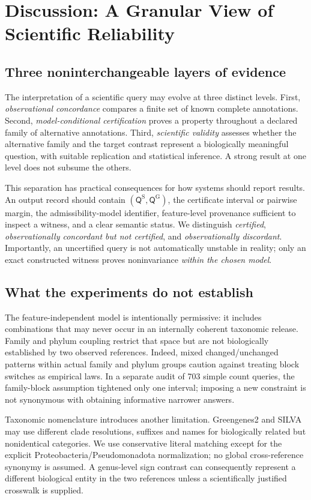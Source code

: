 \documentclass[conference]{IEEEtran}
\newcommand{\Q}{\mathsf{Q}}
\newcommand{\Sref}{\mathrm{S}}
\newcommand{\Gref}{\mathrm{G}}
\begin{document}
\section{Discussion: A Granular View of Scientific Reliability}
\label{sec:discussion}
\subsection{Three noninterchangeable layers of evidence}
The interpretation of a scientific query may evolve at three distinct levels. First, \emph{observational concordance} compares a finite set of known complete annotations. Second, \emph{model-conditional certification} proves a property throughout a declared family of alternative annotations. Third, \emph{scientific validity} assesses whether the alternative family and the target contrast represent a biologically meaningful question, with suitable replication and statistical inference. A strong result at one level does not subsume the others.

This separation has practical consequences for how systems should report results. An output record should contain $(\Q^{\Sref},\Q^{\Gref})$, the certificate interval or pairwise margin, the admissibility-model identifier, feature-level provenance sufficient to inspect a witness, and a clear semantic status. We distinguish \emph{certified}, \emph{observationally concordant but not certified}, and \emph{observationally discordant}. Importantly, an uncertified query is not automatically unstable in reality; only an exact constructed witness proves noninvariance \emph{within the chosen model}.

\subsection{What the experiments do not establish}
The feature-independent model is intentionally permissive: it includes combinations that may never occur in an internally coherent taxonomic release. Family and phylum coupling restrict that space but are not biologically established by two observed references. Indeed, mixed changed/unchanged patterns within actual family and phylum groups caution against treating block switches as empirical laws. In a separate audit of 703 simple count queries, the family-block assumption tightened only one interval; imposing a new constraint is not synonymous with obtaining informative narrower answers.

Taxonomic nomenclature introduces another limitation. Greengenes2 and SILVA may use different clade resolutions, suffixes and names for biologically related but nonidentical categories. We use conservative literal matching except for the explicit Proteobacteria/Pseudomonadota normalization; no global cross-reference synonymy is assumed. A genus-level sign contrast can consequently represent a different biological entity in the two references unless a scientifically justified crosswalk is supplied.
\end{document}
